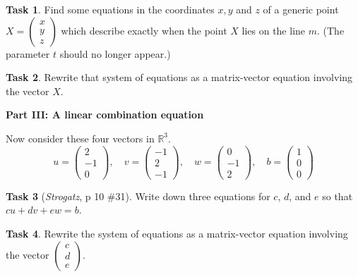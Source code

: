 \documentclass[11pt]{amsart}
\theoremstyle{definition}
\newtheorem{task}{Task}
\begin{document}
\begin{task}
Find some equations in the coordinates $x, y$ and $z$ of a generic point $X = \left( \begin{smallmatrix} x \\ y \\ z\end{smallmatrix} \right)$ which describe exactly when the point $X$ lies on the line $m$. (The parameter $t$ should no longer appear.)
\end{task}

\vspace{1in}

\begin{task}
Rewrite that system of equations as a matrix-vector equation involving the vector $X$.
\end{task}

\clearpage

\begin{center}\textbf{Part III: A linear combination equation}\end{center}

Now consider these four vectors in $\mathbb{R}^3$.
\[
u = \begin{pmatrix} 2 \\ -1 \\ 0 \end{pmatrix}, \quad v = \begin{pmatrix} -1\\2\\-1 \end{pmatrix}, \quad w = \begin{pmatrix}0\\-1\\2\end{pmatrix}, \quad b = \begin{pmatrix} 1\\0\\0\end{pmatrix}
\]


\begin{task}[\emph{Strogatz}, p 10 \#31]
Write down three equations for $c$, $d$, and $e$ so that $cu + dv + ew = b$.
\end{task}

\vspace{2in}

\begin{task}
Rewrite the system of equations as a matrix-vector equation involving the vector $\left(\begin{smallmatrix} c \\ d \\ e \end{smallmatrix} \right)$.
\end{task}
\end{document}
